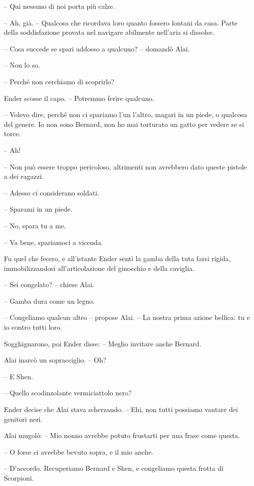 {-- Qui nessuno di noi porta più calze.}

{-- Ah, già. -- Qualcosa che ricordava loro quanto fossero lontani da
	casa. Parte della soddisfazione provata nel navigare abilmente nell'aria
	si dissolse.}

{-- Cosa succede se spari addosso a qualcuno? -- domandò Alai.}

{-- Non lo so.}

{-- Perché non cerchiamo di scoprirlo?}

{Ender scosse il capo. -- Potremmo ferire qualcuno.}

{-- Volevo dire, perché non ci spariamo l'un l'altro, magari in un
	piede, o qualcosa del genere. Io non sono Bernard, non ho mai torturato
	un gatto per vedere se si torce.}

{-- Ah!}

{-- Non può essere troppo pericoloso, altrimenti non avrebbero dato
	queste pistole a dei ragazzi.}

{-- Adesso ci considerano soldati.}

{-- Sparami in un piede.}

{-- No, spara tu a me.}

{-- Va bene, spariamoci a vicenda.}

{Fu quel che fecero, e all'istante Ender sentì la gamba della tuta farsi
	rigida, immobilizzandosi all'articolazione del ginocchio e della
	caviglia.}

{-- Sei congelato? -- chiese Alai.}

{-- Gamba dura come un legno.}

{-- Congeliamo qualcun altro -- propose Alai. -- La nostra prima azione
	bellica: tu e io contro tutti loro.}

{Sogghignarono, poi Ender disse: -- Meglio invitare anche Bernard.}

{Alai inarcò un sopracciglio. -- Oh?}

{-- E Shen.}

{-- Quello scodinzolante vermiciattolo nero?}

{Ender decise che Alai stava scherzando. -- Ehi, non tutti possiamo
	vantare dei genitori neri.}

{Alai mugolò: -- Mio nonno avrebbe potuto frustarti per una frase come
	questa.}

{-- O forse ci avrebbe bevuto sopra, e il mio anche.}

{-- D'accordo. Recuperiamo Bernard e Shen, e congeliamo questa frotta di
	Scorpioni.}

